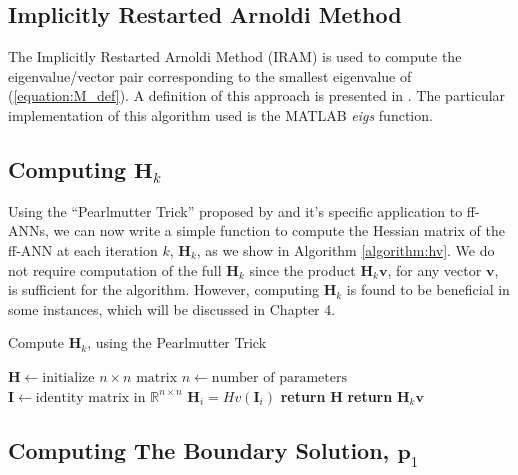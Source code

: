 \documentclass[letterpaper,12pt,titlepage,oneside,final]{book}
\begin{document}
	\subsection{Implicitly Restarted Arnoldi Method}
	
	The Implicitly Restarted Arnoldi Method (IRAM) is used to compute the eigenvalue/vector pair corresponding to the smallest eigenvalue of (\ref{equation:M_def}). A definition of this approach is presented in \cite{IRAM}. The particular implementation of this algorithm used is the MATLAB \textit{eigs} function. 
	
	\subsection{Computing $\mathbf{H}_{k}$}
	
	Using the ``Pearlmutter Trick'' proposed by \cite{Pearlmutter.1993} and it's specific application to ff-ANNs, we can now write a simple function to compute the Hessian matrix of the ff-ANN at each iteration $k$, $\mathbf{H}_{k}$, as we show in Algorithm \ref{algorithm:hv}. We do not require computation of the full $\mathbf{H}_{k}$ since 
	the product $\mathbf{H}_{k}\mathbf{v}$, for any vector $\mathbf{v}$, is sufficient for the algorithm. However, computing $\mathbf{H}_{k}$ is found to be beneficial in some instances, which will be discussed in Chapter 4.
	\makeatletter
	\def\BState{\State\hskip-\ALG@thistlm}
	\makeatother
	
	\begin{algorithm}
		\caption{Compute $\mathbf{H}_{k}$, using the Pearlmutter Trick \cite{Pearlmutter.1993}}
		\begin{algorithmic}[1]
			\State $\mathbf{H} \gets \text{initialize } n \times n \text{ matrix}$
			\State $n \gets \text{number of parameters}$
			\State $\mathbf{I} \gets \text{identity matrix in }\mathbb{R}^{n\times n}$
			\State $\mathbf{H}_{i} = Hv(\mathbf{I}_{i})$
			\EndFor
			\State \textbf{return} $\mathbf{H}$
			\EndProcedure
			\State \textbf{return} $\mathbf{H}_{k}\mathbf{v}$
			\EndProcedure			
		\end{algorithmic}
		\label{algorithm:hv}
	\end{algorithm}

	\subsection{Computing The Boundary Solution, $\mathbf{p}_{1}$}
	
\end{document}
